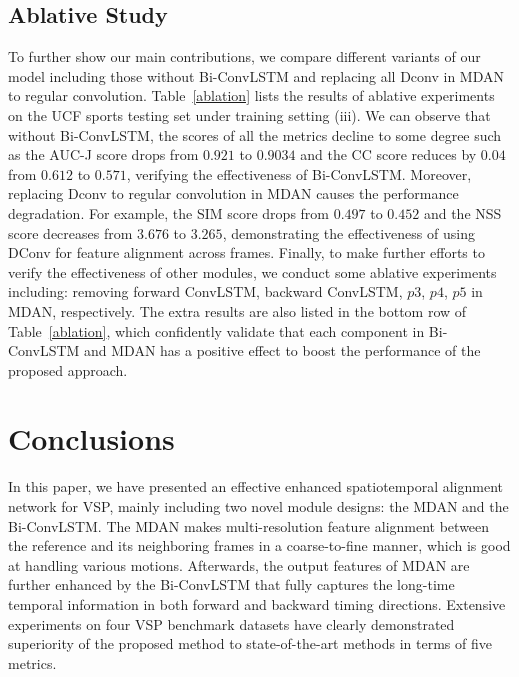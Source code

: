 \documentclass[review]{elsarticle}
\begin{document}
\subsection{Ablative Study}
To further show our main contributions, we compare different variants of our model including those without Bi-ConvLSTM and replacing all Dconv in MDAN to regular convolution.
Table~\ref{ablation} lists the results of ablative experiments on the UCF sports testing set under training setting (iii).
We can observe that without Bi-ConvLSTM, the scores of all the metrics decline to some degree such as the AUC-J score drops from $0.921$ to $0.9034$ and the CC score reduces by $0.04$ from $0.612$ to $0.571$, verifying the effectiveness of Bi-ConvLSTM.
Moreover, replacing Dconv to regular convolution in MDAN causes the performance degradation.
For example, the SIM score drops from $0.497$ to $0.452$ and the NSS score decreases from $3.676$ to $3.265$, demonstrating the effectiveness of using DConv for feature alignment across frames.
Finally, to make further efforts to verify the effectiveness of other modules, we conduct some ablative experiments including: removing forward ConvLSTM, backward ConvLSTM, $p3$, $p4$, $p5$ in MDAN, respectively.
The extra results are also listed in the bottom row of Table~\ref{ablation}, which confidently validate that each component in Bi-ConvLSTM and MDAN has a positive effect to boost the performance of the proposed approach.


\section{Conclusions}
In this paper, we have presented an effective enhanced spatiotemporal alignment network for VSP, mainly including two novel module designs: the MDAN and the Bi-ConvLSTM.
The MDAN makes multi-resolution feature alignment between the reference and its neighboring frames in a coarse-to-fine manner, which is good at handling various motions.
Afterwards, the output features of MDAN are further enhanced by the Bi-ConvLSTM that fully captures the long-time temporal information in both forward and backward timing directions.
Extensive experiments on four VSP benchmark datasets have clearly demonstrated superiority of the proposed method to state-of-the-art methods in terms of five metrics.


\end{document}
